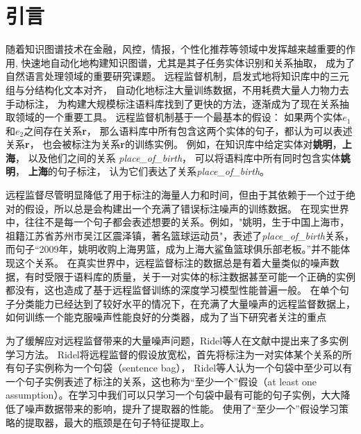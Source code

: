 \documentclass[UTF8]{csoarticle}
\begin{document}
\maketitle



\section{引言}
随着知识图谱技术在金融，风控，情报，个性化推荐等领域中发挥越来越重要的作用,
快速地自动化地构建知识图谱，尤其是其子任务实体识别和关系抽取，
成为了自然语言处理领域的重要研究课题。
远程监督机制，启发式地将知识库中的三元组与分结构化文本对齐，
自动化地标注大量训练数据，不用耗费大量人力物力去手动标注，
为构建大规模标注语料库找到了更快的方法，逐渐成为了现在关系抽取领域的一个重要工具。
远程监督机制基于一个最基本的假设：
如果两个实体\textbf{$e_1$}和\textbf{$e_2$}之间存在关系\textbf{r}，
那么语料库中所有包含这两个实体的句子，都认为可以表述关系\textbf{r}，
也会被标注为关系\textbf{r}的训练实例。
例如，在知识库中给定实体对\textbf{姚明}，\textbf{上海}，
以及他们之间的关系 \textit{place\_of\_birth}，
可以将语料库中所有同时包含实体\textbf{姚明}， \textbf{上海}的句子标注，
认为它们表达了关系\textit{place\_of\_birth}。

远程监督尽管明显降低了用于标注的海量人力和时间，但由于其依赖于一个过于绝对的假设，所以总是会构建出一个充满了错误标注噪声的训练数据。
在现实世界中，往往不是每一个句子都会表述想要的关系。例如，"姚明，生于中国上海市，祖籍江苏省苏州市吴江区震泽镇，著名篮球运动员"，表述了\textit{place\_of\_birth}关系，
而句子“2009年，姚明收购上海男篮，成为上海大鲨鱼篮球俱乐部老板。”并不能体现这个关系。
在真实世界中，远程监督标注的数据总是有着大量类似的噪声数据，有时受限于语料库的质量，关于一对实体的标注数据甚至可能一个正确的实例都没有，这也造成了基于远程监督训练的深度学习模型性能普遍一般。
在单个句子分类能力已经达到了较好水平的情况下，在充满了大量噪声的远程监督数据上，如何训练一个能克服噪声性能良好的分类器，成为了当下研究者关注的重点


为了缓解应对远程监督带来的大量噪声问题，Ridel等人在文献\cite{bib2}中提出来了多实例学习方法。
Ridel将远程监督的假设放宽松，首先将标注为一对实体某个关系的所有句子实例称为一个句袋（sentence bag），
Ridel等人认为一个句袋中至少可以有一个句子实例表述了标注的关系，这也称为“至少一个”假设（at least one assumption）。在学习中我们可以只学习一个句袋中最有可能的句子实例，大大降低了噪声数据带来的影响，提升了提取器的性能。
使用了“至少一个”假设学习策略的提取器，最大的瓶颈是在句子特征提取上。
\end{document}
